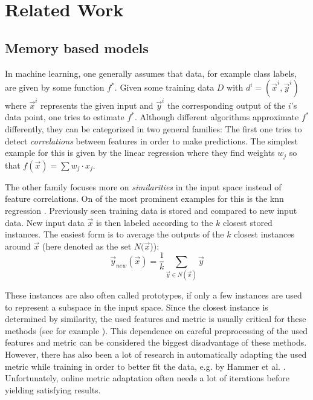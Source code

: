 \chapter{Related Work \label{chap:stateOfTheArt}}



\section{Memory based models}

In machine learning, one generally assumes that data, for example class labels, are given by some function $f^*$. Given some training data $D$ with $d^i =(\vec{x}^i,\vec{y}^i)$ where $\vec{x}^i$ represents the given input and $\vec{y}^i$ the corresponding output of the $i$'s data point, one tries to estimate $f^*$. 
Although different algorithms approximate $f^*$ differently, they can be categorized in two general families: The first one tries to detect \textit{correlations} between features in order to make predictions. The simplest example for this is given by the linear regression \cite{linearRegression} where they find weights $w_j$ so that $f(\vec{x}) = \sum w_j \cdot x_j$. 

The other family focuses more on \textit{similarities} in the input space instead of feature correlations. On of the most prominent examples for this is the \gls{knn} regression \cite{kibler1987learning}. Previously seen training data is stored and compared to new input data. New input data $\vec{x}$ is then labeled according to the $k$ closest stored instances. The easiest form is to average the outputs of the $k$ closest instances around $\vec{x}$ (here denoted as the set $N(\vec{x}$)):
\begin{equation}
\vec{y}_{new}(\vec{x}) = \frac{1}{k} \sum_{\vec{y} \in N(\vec{x})} \vec{y}
\end{equation}

These instances are also often called prototypes, if only a few instances are used to represent a subspace in the input space. Since the closest instance is determined by similarity, the used features and metric is usually critical for these methods (see for example \cite{metric1, metric2}). This dependence on careful preprocessing of the used features and metric can be considered the biggest disadvantage of these methods. However, there has also been a lot of research in automatically adapting the used metric while training in order to better fit the data, e.g. by Hammer et al. \cite{lvq}. Unfortunately, online metric adaptation often needs a lot of iterations before yielding satisfying results. 

